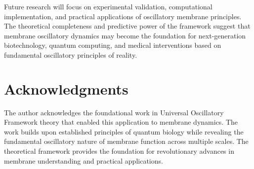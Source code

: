\documentclass[12pt,a4paper]{article}
\begin{document}
Future research will focus on experimental validation, computational implementation, and practical applications of oscillatory membrane principles. The theoretical completeness and predictive power of the framework suggest that membrane oscillatory dynamics may become the foundation for next-generation biotechnology, quantum computing, and medical interventions based on fundamental oscillatory principles of reality.

\section{Acknowledgments}

The author acknowledges the foundational work in Universal Oscillatory Framework theory that enabled this application to membrane dynamics. The work builds upon established principles of quantum biology while revealing the fundamental oscillatory nature of membrane function across multiple scales. The theoretical framework provides the foundation for revolutionary advances in membrane understanding and practical applications.
\end{document}
